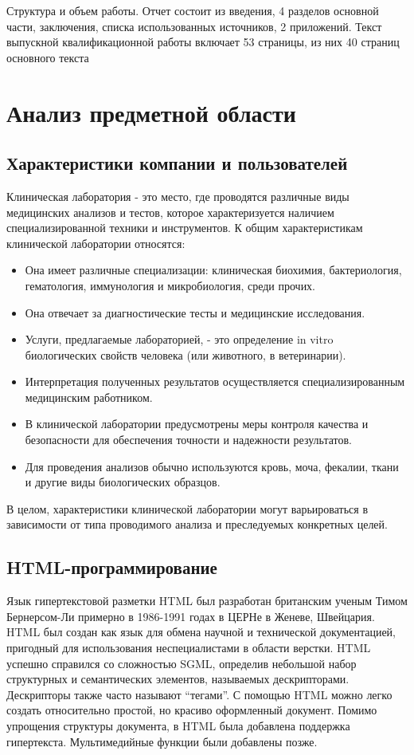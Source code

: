 \newsection
\setcounter{figure}{0}\setcounter{table}{0}
Структура и объем работы. Отчет состоит из введения, 4 разделов основной части, заключения, списка использованных источников, 2 приложений. Текст выпускной квалификационной работы включает 53 страницы, из них 40 страниц основного текста\section{Анализ предметной области}
\subsection{Характеристики компании и пользователей}

Клиническая лаборатория - это место, где проводятся различные виды медицинских анализов и тестов, которое характеризуется наличием специализированной техники и инструментов. К общим характеристикам клинической лаборатории относятся:

\begin{itemize}
	\item Она имеет различные специализации: клиническая биохимия, бактериология, гематология, иммунология и микробиология, среди прочих.
	\item Она отвечает за диагностические тесты и медицинские исследования.
	\item Услуги, предлагаемые лабораторией, - это определение in vitro биологических свойств человека (или животного, в ветеринарии).
	\item Интерпретация полученных результатов осуществляется специализированным медицинским работником.
	\item В клинической лаборатории предусмотрены меры контроля качества и безопасности для обеспечения точности и надежности результатов.
	\item Для проведения анализов обычно используются кровь, моча, фекалии, ткани и другие виды биологических образцов.
\end{itemize}

В целом, характеристики клинической лаборатории могут варьироваться в зависимости от типа проводимого анализа и преследуемых конкретных целей.

\subsection{HTML-программирование}

Язык гипертекстовой разметки HTML был разработан британским ученым Тимом Бернерсом-Ли примерно в 1986-1991 годах в ЦЕРНе в Женеве, Швейцария. HTML был создан как язык для обмена научной и технической документацией, пригодный для использования неспециалистами в области верстки. HTML успешно справился со сложностью SGML, определив небольшой набор структурных и семантических элементов, называемых дескрипторами. Дескрипторы также часто называют ``тегами''. С помощью HTML можно легко создать относительно простой, но красиво оформленный документ. Помимо упрощения структуры документа, в HTML была добавлена поддержка гипертекста. Мультимедийные функции были добавлены позже.

